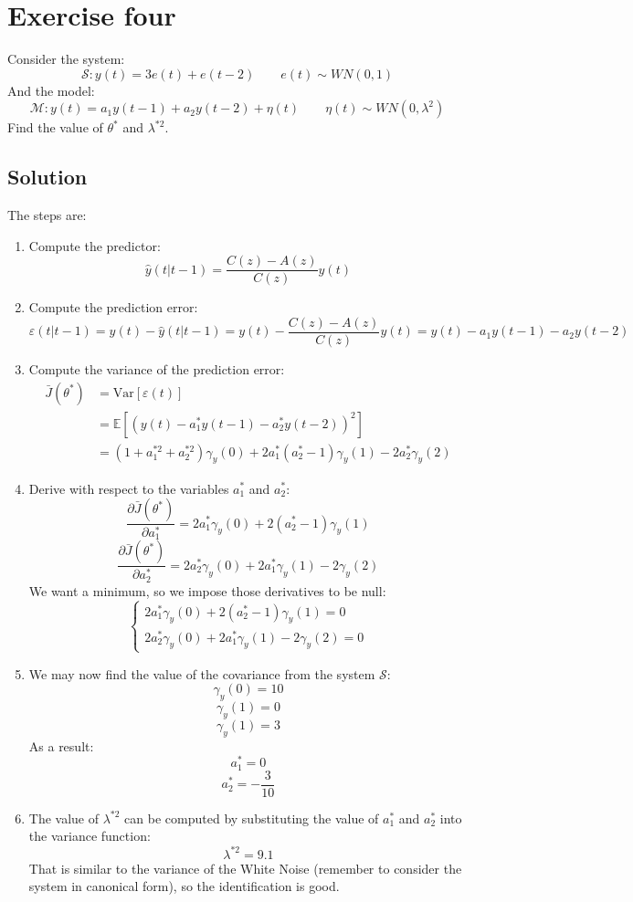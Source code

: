 \section{Exercise four}

Consider the system: 
\[\mathcal{S}:y(t)=3e(t)+e(t-2)\qquad e(t)\sim WN(0,1)\]
And the model: 
\[\mathcal{M}:y(t)=a_1y(t-1)+a_2y(t-2)+\eta(t) \qquad \eta(t)\sim WN(0,\lambda^2)\]
Find the value of $\theta^\ast$ and $\lambda^{\ast 2}$. 

\subsection*{Solution}
The steps are: 
\begin{enumerate}
    \item Compute the predictor: 
        \[\hat{y}(t|t-1)=\dfrac{C(z)-A(z)}{C(z)}y(t)\]
    \item Compute the prediction error: 
        \[\varepsilon(t|t-1)=y(t)-\hat{y}(t|t-1)=y(t)-\dfrac{C(z)-A(z)}{C(z)}y(t)=y(t)-a_1y(t-1)-a_2y(t-2)\]
    \item Compute the variance of the prediction error: 
        \begin{align*}
            \bar{J}(\theta^\ast)    &=\text{Var}\left[\varepsilon(t)\right]\\   
                                    &=\mathbb{E}\left[ {\left(y(t)-a_1^\ast y(t-1)-a_2^\ast y(t-2)\right)}^2 \right] \\
                                    &=\left(1+a_1^{ \ast 2}+a_2^{\ast 2}\right)\gamma_y(0)+2a_1^\ast\left(a_2^\ast-1\right)\gamma_y(1)-2a_2^\ast\gamma_y(2)
        \end{align*}
    \item Derive with respect to the variables $a_1^\ast$ and $a_2^\ast$: 
        \[\dfrac{\partial\bar{J}(\theta^\ast)}{\partial a_1^\ast}=2a_1^\ast\gamma_y(0)+2(a_2^\ast-1)\gamma_y(1)\]
        \[\dfrac{\partial\bar{J}(\theta^\ast)}{\partial a_2^\ast}=2a_2^\ast\gamma_y(0)+2a_1^\ast\gamma_y(1)-2\gamma_y(2)\]
        We want a minimum, so we impose those derivatives to be null: 
        \[\begin{cases}
            2a_1^\ast\gamma_y(0)+2(a_2^\ast-1)\gamma_y(1)=0  \\
            2a_2^\ast\gamma_y(0)+2a_1^\ast\gamma_y(1)-2\gamma_y(2)=0
        \end{cases}\]
    \item We may now find the value of the covariance from the system $\mathcal{S}$: 
        \[\gamma_y(0)=10\]
        \[\gamma_y(1)=0\]
        \[\gamma_y(1)=3\]
        As a result: 
        \[a_1^\ast=0\]
        \[a_2^\ast=-\dfrac{3}{10}\]
    \item The value of $\lambda^{\ast 2}$ can be computed by substituting the value of $a_1^\ast$ and $a_2^\ast$ into the variance function: 
        \[\lambda^{\ast 2}=9.1\]
        That is similar to the variance of the  White Noise (remember to consider the system in canonical form), so the identification is good. 
\end{enumerate}